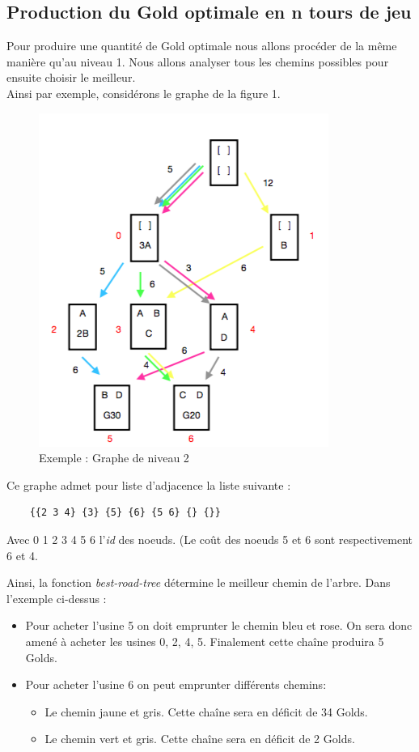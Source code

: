 \subsection{Production du Gold optimale en n tours de jeu}

Pour produire une quantité de Gold optimale nous allons procéder de la même manière qu'au niveau 1. Nous allons analyser tous les chemins possibles pour ensuite choisir le meilleur. \\
\indent Ainsi par exemple, considérons le graphe de la figure 1.


\begin{figure}[H]
		\centering
		\includegraphics[scale=0.75]{graphee.png}
    	\caption{Exemple : Graphe de niveau 2 }
    \end{figure}
    
Ce graphe admet pour liste d'adjacence la liste suivante :

\begin{verbatim}
    {{2 3 4} {3} {5} {6} {5 6} {} {}}
\end{verbatim}

Avec 0 1 2 3 4 5 6 l'\textit{id} des noeuds.
(Le coût des noeuds 5 et 6 sont respectivement 6 et 4.

\indent Ainsi, la fonction \textit{best-road-tree}
détermine le meilleur chemin de l'arbre.
\indent Dans l'exemple ci-dessus :
\begin{itemize}
    \item Pour acheter l'usine 5 on doit emprunter le chemin bleu et rose. On sera donc amené à acheter les usines 0, 2, 4, 5. Finalement cette chaîne produira 5 Golds.
    \item Pour acheter l'usine 6 on peut emprunter différents chemins:
    \begin{itemize}
        \item Le chemin jaune et gris. Cette chaîne sera en déficit de 34 Golds.
        \item Le chemin vert et gris. Cette chaîne sera en déficit de 2 Golds.
    \end{itemize}

\end{itemize}

